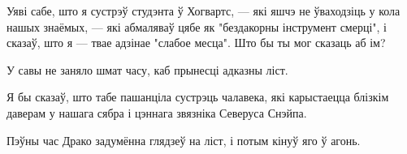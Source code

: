 \begin{writtenNote}
Уяві сабе, што я сустрэў студэнта ў Хогвартс, --- які яшчэ не ўваходзіць у 
кола нашых знаёмых, --- які абмаляваў цябе як "бездакорны інструмент смерці",
і сказаў, што я --- твае адзінае "слабое месца". Што бы ты мог сказаць аб ім?
\end{writtenNote}

У савы не заняло шмат часу, каб прынесці адказны ліст.

\begin{writtenNote}
Я бы сказаў, што табе пашанціла сустрэць чалавека, які карыстаецца блізкім даверам у
нашага сябра і цэннага звязніка Северуса Снэйпа. 
\end{writtenNote}

Пэўны час Драко задумённа глядзеў на ліст, і потым кінуў яго ў агонь.
